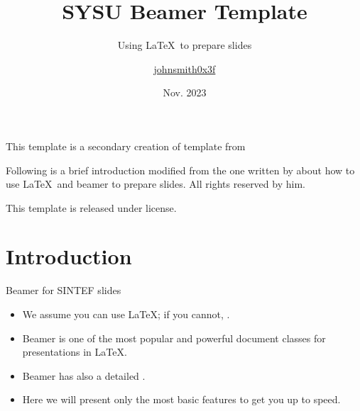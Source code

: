 \documentclass{beamer}
\title{SYSU Beamer Template}
\subtitle{Using \LaTeX\ to prepare slides}
\author{\href{https://github.com/johnsmith0x3f}{johnsmith0x3f}}
\date{Nov. 2023}
\begin{document}
\maketitle

\begin{frame}
    This template is a secondary creation of  template from  \vspace{\baselineskip}

    Following is a brief introduction modified from the one written by  about how to use \LaTeX\ and beamer to prepare slides. All rights reserved by him.\vspace{\baselineskip}

    This template is released under  license.
\end{frame}

\section{Introduction}

\begin{frame}{Beamer for SINTEF slides}{\thesection \, \secname}
    \begin{itemize}
        \item We assume you can use \LaTeX; if you cannot, .
        \item Beamer is one of the most popular and powerful document classes for presentations in \LaTeX.
        \item Beamer has also a detailed .
        \item Here we will present only the most basic features to get you up to speed.
    \end{itemize}
\end{frame}
\end{document}
